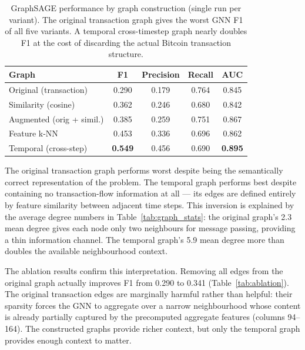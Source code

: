 \begin{table}[!htbp]
\centering
\caption{GraphSAGE performance by graph construction (single run per
  variant). The original transaction graph gives the worst GNN F1 of
  all five variants. A temporal cross-timestep graph nearly doubles F1
  at the cost of discarding the actual Bitcoin transaction structure.}
\label{tab:graph_results}
\small
\begin{tabular}{lcccc}
\toprule
\textbf{Graph} & \textbf{F1} & \textbf{Precision} & \textbf{Recall}
  & \textbf{AUC} \\
\midrule
Original (transaction)    & 0.290 & 0.179 & 0.764 & 0.845 \\
Similarity (cosine)       & 0.362 & 0.246 & 0.680 & 0.842 \\
Augmented (orig + simil.) & 0.385 & 0.259 & 0.751 & 0.867 \\
Feature k-NN              & 0.453 & 0.336 & 0.696 & 0.862 \\
Temporal (cross-step)     & \textbf{0.549} & 0.456 & 0.690 & \textbf{0.895} \\
\bottomrule
\end{tabular}
\end{table}

The original transaction graph performs worst despite being the semantically
correct representation of the problem. The temporal graph performs best
despite containing no transaction-flow information at all — its edges are
defined entirely by feature similarity between adjacent time steps. This
inversion is explained by the average degree numbers in
Table~\ref{tab:graph_stats}: the original graph's 2.3 mean degree gives each
node only two neighbours for message passing, providing a thin information
channel. The temporal graph's 5.9 mean degree more than doubles the available
neighbourhood context.

The ablation results confirm this interpretation. Removing all edges from the
original graph actually improves F1 from 0.290 to 0.341 (Table~\ref{tab:ablation}).
The original transaction edges are marginally harmful rather than helpful: their
sparsity forces the GNN to aggregate over a narrow neighbourhood whose content
is already partially captured by the precomputed aggregate features (columns
94--164). The constructed graphs provide richer context, but only the temporal
graph provides enough context to matter.

